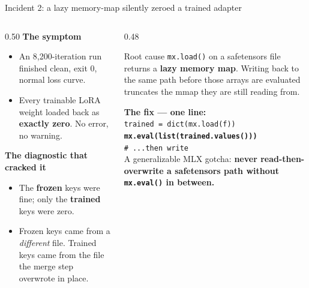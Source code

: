 \documentclass[aspectratio=169,11pt]{beamer}
\newcommand{\good}[1]{\textcolor{jsAccent}{\textbf{#1}}}
\begin{document}
\begin{frame}{Incident 2: a lazy memory-map silently zeroed a trained adapter}
  \small
  \begin{columns}[T]
    \begin{column}{0.50\textwidth}
      \textbf{The symptom}
      \begin{itemize}
        \item An 8{,}200-iteration run finished clean, exit 0, normal loss curve.
        \item Every trainable LoRA weight loaded back as \textbf{exactly zero}. No error, no warning.
      \end{itemize}
      \vspace{0.5em}
      \textbf{The diagnostic that cracked it}
      \begin{itemize}
        \item The \textbf{frozen} keys were fine; only the \textbf{trained} keys were zero.
        \item Frozen keys came from a \emph{different} file. Trained keys came from the file the merge step overwrote in place.
      \end{itemize}
    \end{column}
    \begin{column}{0.48\textwidth}
      \begin{block}{Root cause}
        \texttt{mx.load()} on a safetensors file returns a \textbf{lazy memory map}. Writing back to the same path before those arrays are evaluated truncates the mmap they are still reading from.
      \end{block}
      \vspace{0.4em}
      \textbf{The fix --- one line:}
      \vspace{0.2em}\\
      {\small\texttt{trained = dict(mx.load(f))}}\\
      {\small\texttt{\good{mx.eval(list(trained.values()))}}}\\
      {\small\texttt{\# ...then write}}
      \vspace{0.6em}\\
      \small A generalizable MLX gotcha: \textbf{never read-then-overwrite a safetensors path without \texttt{mx.eval()} in between.}
    \end{column}
  \end{columns}
\end{frame}
\end{document}

